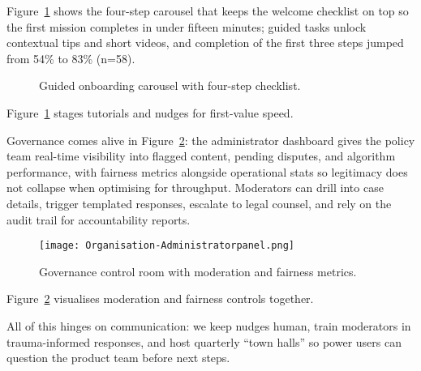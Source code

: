 Figure~\ref{fig:onboarding-flow} shows the four-step carousel that keeps the welcome checklist on top so the first mission completes in under fifteen minutes; guided tasks unlock contextual tips and short videos, and completion of the first three steps jumped from 54\% to 83\% (n=58).

\begin{figure}[H]
  \centering
  \caption{Guided onboarding carousel with four-step checklist.}
  \label{fig:onboarding-flow}
\end{figure}

Figure~\ref{fig:onboarding-flow} stages tutorials and nudges for first-value speed.

Governance comes alive in Figure~\ref{fig:admin-panel}: the administrator dashboard gives the policy team real-time visibility into flagged content, pending disputes, and algorithm performance, with fairness metrics alongside operational stats so legitimacy does not collapse when optimising for throughput. Moderators can drill into case details, trigger templated responses, escalate to legal counsel, and rely on the audit trail for accountability reports.

\begin{figure}[H]
  \centering
  \texttt{[image: Organisation-Administratorpanel.png]}
  \caption{Governance control room with moderation and fairness metrics.}
  \label{fig:admin-panel}
\end{figure}

Figure~\ref{fig:admin-panel} visualises moderation and fairness controls together.

All of this hinges on communication: we keep nudges human, train moderators in trauma-informed responses, and host quarterly ``town halls'' so power users can question the product team before next steps.
